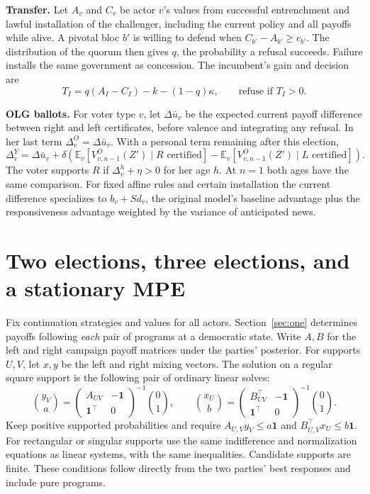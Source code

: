 \documentclass[11pt,letterpaper]{article}
\newcommand{\E}{\mathbb E}\newcommand{\one}{\mathbf 1}\newcommand{\UU}{\mathsf U}
\newcommand{\statement}[1]{\textbf{#1}\enspace}
\begin{document}
\statement{Transfer.} Let \(A_v\) and \(C_v\) be actor \(v\)'s values from successful entrenchment and lawful installation of the challenger, including the current policy and all payoffs while alive. A pivotal bloc \(b'\) is willing to defend when \(C_{b'}-A_{b'}\ge c_{b'}\). The distribution of the quorum then gives \(q\), the probability a refusal succeeds. Failure installs the same government as concession. The incumbent's gain and decision are
\begin{equation}
 T_I=q(A_I-C_I)-k-(1-q)\kappa,\qquad \text{refuse if }T_I>0.\label{eq:gain}
\end{equation}

\statement{OLG ballots.} For voter type \(v\), let \(\Delta\bar u_v\) be the expected current payoff difference between right and left certificates, before valence and integrating any refusal. In her last term \(\Delta_v^O=\Delta\bar u_v\). With a personal term remaining after this election,
\[
 \Delta_v^Y=\Delta\bar u_v+\delta
 \left(\E_v[V_{v,n-1}^{O}(Z')\mid R\text{ certified}]
       -\E_v[V_{v,n-1}^{O}(Z')\mid L\text{ certified}]\right).
\]
The voter supports \(R\) if \(\Delta_v^h+\eta>0\) for her age \(h\). At \(n=1\) both ages have the same comparison. For fixed affine rules and certain installation the current difference specializes to \(b_v+S d_v\), the original model's baseline advantage plus the responsiveness advantage weighted by the variance of anticipated news.

\newpage
\section{Two elections, three elections, and a stationary MPE}\label{sec:full}
Fix continuation strategies and values for all actors. Section~\ref{sec:one} determines payoffs following \emph{each} pair of programs at a democratic state. Write \(A,B\) for the left and right campaign payoff matrices under the parties' posterior. For supports \(U,V\), let \(x,y\) be the left and right mixing vectors. The solution on a regular square support is the following pair of ordinary linear solves:
\[
 \binom{y_V}{a}=\begin{pmatrix}A_{UV}&-\one\\\one^\top&0\end{pmatrix}^{-1}
        \binom{0}{1},\qquad
 \binom{x_U}{b}=\begin{pmatrix}B_{UV}^{\top}&-\one\\\one^\top&0\end{pmatrix}^{-1}
        \binom{0}{1}.
\]
Keep positive supported probabilities and require \(A_{\bar U,V}y_V\le a\one\) and \(B_{U,\bar V}^{\top}x_U\le b\one\). For rectangular or singular supports use the same indifference and normalization equations as linear systems, with the same inequalities. Candidate supports are finite. These conditions follow directly from the two parties' best responses and include pure programs.
\end{document}
